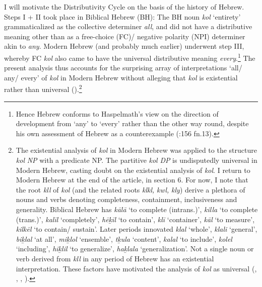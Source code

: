 \documentclass[output=paper]{langsci/langscibook}
\begin{document}
I will motivate the Distributivity Cycle on the basis of the history of Hebrew. Steps I + II took place in Biblical Hebrew (BH): The BH noun \textit{kol} ‘entirety’ grammaticalized as the collective determiner \textit{all}, and did not have a distributive meaning other than as a free-choice (FC)/ negative polarity (NPI) determiner akin to \textit{any}. Modern Hebrew (and probably much earlier) underwent step III, whereby FC \textit{kol} also came to have the universal distributive meaning \textit{every}.\footnote{Hence Hebrew conforms to Haspelmath’s view on the direction of development from ‘any’ to ‘every’ rather than the other way round, despite his own assessment of Hebrew as a counterexample (\citealt{Haspelmath1997}:156 fn.13).}  The present analysis thus accounts for the surprising array of interpretations ‘all/ any/ every’ of \textit{kol} in Modern Hebrew without alleging that \textit{kol} is existential rather than universal (\citealt{LevMargulis2013}).\footnote{The existential analysis of \textit{kol} in Modern Hebrew was applied to the structure \textit{kol} \textit{NP} with a predicate NP. The partitive \textit{kol} \textit{DP} is undisputedly universal in Modern Hebrew, casting doubt on the existential analysis of \textit{kol}. I return to Modern Hebrew at the end of the article, in section 6. For now, I note that the root \textit{kll} of \textit{kol} (and the related roots \textit{klkl,} \textit{kwl,} \textit{kly}) derive a plethora of nouns and verbs denoting completeness, containment, inclusiveness and generality. Biblical Hebrew has \textit{kālā} ‘to complete (intrans.)’, \textit{killa} ‘to complete (trans.)’, \textit{kalīl} ‘completely’, \textit{hēḵīl} ‘to contain’, \textit{klī} ‘container’, \textit{kāl} ‘to measure’, \textit{kilkēl} ‘to contain/ sustain’. Later periods innovated \textit{klal} ‘whole’, \textit{klali} ‘general’, \textit{biḵlal} ‘at all’, \textit{miḵlol} ‘ensemble’, \textit{tḵula} ‘content’, \textit{kalal} ‘to include’, \textit{kolel} ‘including’, \textit{hiḵlil} ‘to generalize’, \textit{haḵlala} ‘generalization’. Not a single noun or verb derived from \textit{kll} in any period of Hebrew has an existential interpretation. These factors have motivated the analysis of \textit{kol} as universal (\citealt{DoronMittwoch1986}, \citealt{Glinert1989}, \citealt{FrancezGoldring2012}, \citealt{Danon2013}).} 
\end{document}
